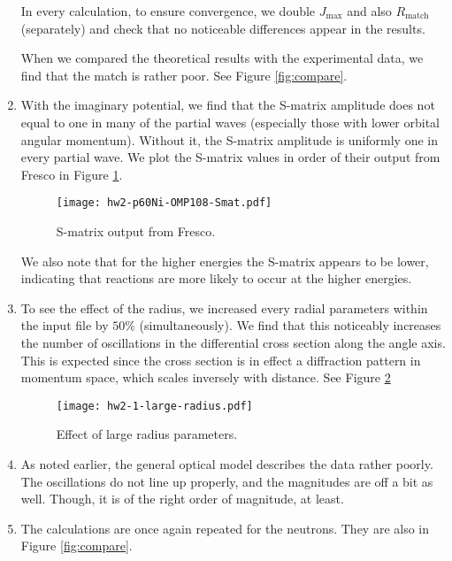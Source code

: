 \documentclass[fleqn, 12pt]{article}
\begin{document}
\begin{enumerate}
  In every calculation, to ensure convergence, we double $J_{\text{max}}$ and
  also $R_{\text{match}}$ (separately) and check that no noticeable
  differences appear in the results.

  When we compared the theoretical results with the experimental data, we find
  that the match is rather poor.  See Figure \ref{fig:compare}.

\item With the imaginary potential, we find that the S-matrix amplitude does
  not equal to one in many of the partial waves (especially those with lower
  orbital angular momentum).  Without it, the S-matrix amplitude is uniformly
  one in every partial wave.  We plot the S-matrix values in order of their
  output from Fresco in Figure \ref{fig:s-matrix}.

  \begin{figure}
    \centering
    \texttt{[image: hw2-p60Ni-OMP108-Smat.pdf]}
    \caption{S-matrix output from Fresco.}
    \label{fig:s-matrix}
  \end{figure}

  We also note that for the higher energies the S-matrix appears to be lower,
  indicating that reactions are more likely to occur at the higher energies.

\item To see the effect of the radius, we increased every radial parameters
  within the input file by $50\%$ (simultaneously).  We find that this noticeably
  increases the number of oscillations in the differential cross section along
  the angle axis.  This is expected since the cross section is in effect a
  diffraction pattern in momentum space, which scales inversely with distance.
  See Figure \ref{fig:radius}

  \begin{figure}
    \centering
    \texttt{[image: hw2-1-large-radius.pdf]}
    \caption{Effect of large radius parameters.}
    \label{fig:radius}
  \end{figure}

\item As noted earlier, the general optical model describes the data rather
  poorly.  The oscillations do not line up properly, and the magnitudes are
  off a bit as well.  Though, it is of the right order of magnitude, at least.

\item The calculations are once again repeated for the neutrons.  They are
  also in Figure \ref{fig:compare}.


\end{enumerate}
\end{document}

